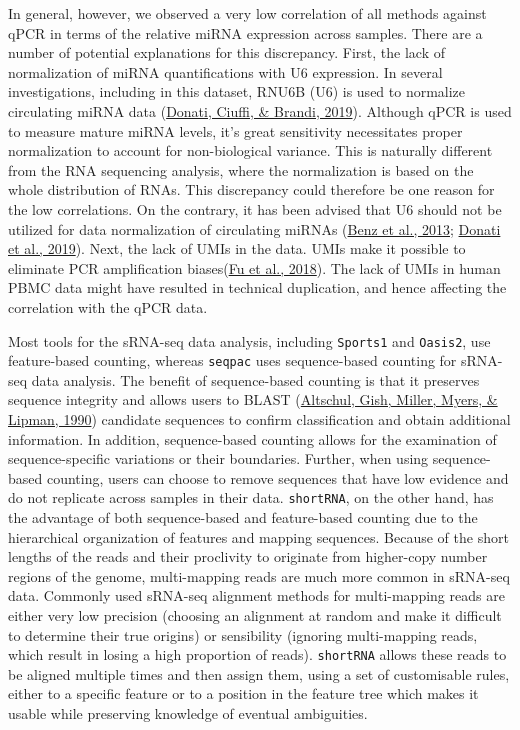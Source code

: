 \documentclass[12pt,twoside]{reedthesis}
\begin{document}
In general, however, we observed a very low correlation of all methods
against qPCR in terms of the relative miRNA expression across samples.
There are a number of potential explanations for this discrepancy.
First, the lack of normalization of miRNA quantifications with U6
expression. In several investigations, including in this dataset, RNU6B
(U6) is used to normalize circulating miRNA data (\protect\hyperlink{ref-donati2019}{Donati, Ciuffi, \& Brandi, 2019}). Although
qPCR is used to measure mature miRNA levels, it's great sensitivity
necessitates proper normalization to account for non-biological
variance. This is naturally different from the RNA sequencing analysis,
where the normalization is based on the whole distribution of RNAs. This
discrepancy could therefore be one reason for the low correlations. On
the contrary, it has been advised that U6 should not be utilized for
data normalization of circulating miRNAs (\protect\hyperlink{ref-benz2013}{Benz et al., 2013}; \protect\hyperlink{ref-donati2019}{Donati et al., 2019}). Next,
the lack of UMIs in the data. UMIs make it possible to eliminate PCR
amplification biases(\protect\hyperlink{ref-fu2018}{Fu et al., 2018}). The lack of UMIs in human PBMC data might
have resulted in technical duplication, and hence affecting the
correlation with the qPCR data.

Most tools for the sRNA-seq data analysis, including \texttt{Sports1} and \texttt{Oasis2},
use feature-based counting, whereas \texttt{seqpac} uses sequence-based counting
for sRNA-seq data analysis. The benefit of sequence-based counting is
that it preserves sequence integrity and allows users to BLAST
(\protect\hyperlink{ref-altschul1990}{Altschul, Gish, Miller, Myers, \& Lipman, 1990}) candidate sequences to confirm classification and obtain
additional information. In addition, sequence-based counting allows for
the examination of sequence-specific variations or their boundaries.
Further, when using sequence-based counting, users can choose to remove
sequences that have low evidence and do not replicate across samples in
their data. \texttt{shortRNA}, on the other hand, has the advantage of both
sequence-based and feature-based counting due to the hierarchical
organization of features and mapping sequences. Because of the short
lengths of the reads and their proclivity to originate from higher-copy
number regions of the genome, multi-mapping reads are much more common
in sRNA-seq data. Commonly used sRNA-seq alignment methods for
multi-mapping reads are either very low precision (choosing an alignment
at random and make it difficult to determine their true origins) or
sensibility (ignoring multi-mapping reads, which result in losing a high
proportion of reads). \texttt{shortRNA} allows these reads to be aligned multiple
times and then assign them, using a set of customisable rules, either to
a specific feature or to a position in the feature tree which makes it
usable while preserving knowledge of eventual ambiguities.
\end{document}
